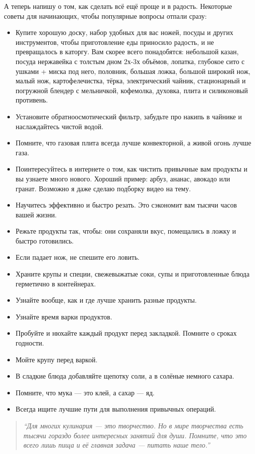А теперь напишу о том, как сделать всё ещё проще и в радость. Некоторые советы для начинающих, чтобы популярные вопросы отпали сразу:
\begin{itemize}
\item  Купите хорошую доску, набор удобных для вас ножей, посуды и других инструментов, чтобы приготовление еды приносило радость, и не превращалось в каторгу. Вам скорее всего понадобятся: небольшой казан, посуда нержавейка с толстым дном 2х-3х объёмов, лопатка, глубокое сито с ушками + миска под него, половник, большая ложка, большой широкий нож, малый нож, картофелечистка, тёрка, электрический чайник, стационарный и погружной блендер с мельничкой, кофемолка, духовка, плита и силиконовый противень.
\item  Установите обратноосмотический фильтр, забудьте про накипь в чайнике и наслаждайтесь чистой водой.
\item  Помните, что газовая плита всегда лучше конвекторной, а живой огонь лучше газа.
\item  Поинтересуйтесь в интернете о том, как чистить привычные вам продукты и вы узнаете много нового. Хороший пример: арбуз, ананас, авокадо или гранат. Возможно я даже сделаю подборку видео на тему.
\item  Научитесь эффективно и быстро резать. Это сэкономит вам тысячи часов вашей жизни.
\item  Режьте продукты так, чтобы: они сохраняли вкус, помещались в ложку и быстро готовились.
\item  Если падает нож, не спешите его ловить.
\item  Храните крупы и специи, свежевыжатые соки, супы и приготовленные блюда герметично в контейнерах.
\item  Узнайте вообще, как и где лучше хранить разные продукты.
\item  Узнайте время варки продуктов.
\item  Пробуйте и нюхайте каждый продукт перед закладкой. Помните о сроках годности.
\item  Мойте крупу перед варкой.
\item  В сладкие блюда добавляйте щепотку соли, а в солёные немного сахара.
\item  Помните, что мука — это клей, а сахар — яд.
\item  Всегда ищите лучшие пути для выполнения привычных операций.
\end{itemize}

\begin{quote}
    \emph{``Для многих кулинария — это творчество. Но в мире творчества есть тысячи гораздо более интересных занятий для души. Помните, что это всего лишь пища и её главная задача — питать наше тело.''}

\end{quote}

